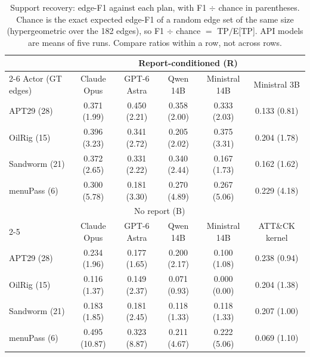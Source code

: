 \begin{table}[t]
\centering
\small
\setlength{\tabcolsep}{5pt}
\begin{tabular}{@{}lccccc@{}}
\toprule
 & \multicolumn{5}{c}{Report-conditioned (R)} \\
\cmidrule(l){2-6}
Actor (GT edges) & Claude Opus & GPT-6 Astra & Qwen 14B & Ministral 14B & Ministral 3B \\
\midrule
APT29 (28) & 0.371 (1.99) & 0.450 (2.21) & 0.358 (2.00) & 0.333 (2.03) & 0.133 (0.81) \\
OilRig (15) & 0.396 (3.23) & 0.341 (2.72) & 0.205 (2.02) & 0.375 (3.31) & 0.204 (1.78) \\
Sandworm (21) & 0.372 (2.65) & 0.331 (2.22) & 0.340 (2.44) & 0.167 (1.73) & 0.162 (1.62) \\
menuPass (6) & 0.300 (5.78) & 0.181 (3.30) & 0.270 (4.89) & 0.267 (5.06) & 0.229 (4.18) \\
\midrule
 & \multicolumn{4}{c}{No report (B)} & \\
\cmidrule(lr){2-5}
 & Claude Opus & GPT-6 Astra & Qwen 14B & Ministral 14B & ATT\&CK kernel \\
\midrule
APT29 (28) & 0.234 (1.96) & 0.177 (1.65) & 0.200 (2.17) & 0.100 (1.08) & 0.238 (0.94) \\
OilRig (15) & 0.116 (1.37) & 0.149 (2.37) & 0.071 (0.93) & 0.000 (0.00) & 0.204 (1.38) \\
Sandworm (21) & 0.183 (1.85) & 0.181 (2.45) & 0.118 (1.33) & 0.118 (1.33) & 0.207 (1.00) \\
menuPass (6) & 0.495 (10.87) & 0.323 (8.87) & 0.211 (4.67) & 0.222 (5.06) & 0.069 (1.10) \\
\bottomrule
\end{tabular}
\caption{Support recovery: edge-F1 against each plan, with F1 $\div$ chance in parentheses. Chance is the exact expected edge-F1 of a random edge set of the same size (hypergeometric over the 182 edges), so F1 $\div$ chance $=$ TP$/$E[TP]. API models are means of five runs. Compare ratios within a row, not across rows.}
\label{tab:recovery}
\end{table}

